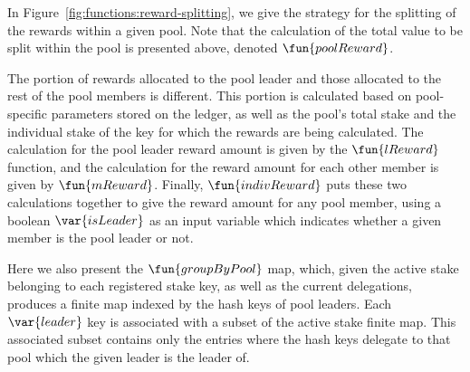 In Figure~\ref{fig:functions:reward-splitting}, we give the strategy for the
splitting of the rewards within a given pool. Note that the calculation of
the total value to be split within the pool is presented above, denoted $\fun{poolReward}$.

The portion of rewards allocated to the pool leader and those allocated to
the rest of the pool members is different. This portion is calculated based
on pool-specific parameters stored on the ledger, as well as
the pool's total stake and the individual stake of the key for which the rewards
are being calculated. The calculation for the pool
leader reward amount is given by the $\fun{lReward}$ function, and the
calculation for the reward amount for each other member is given by $\fun{mReward}$.
Finally, $\fun{indivReward}$ puts these two calculations together to give the
reward amount for any pool member, using a boolean $\var{isLeader}$
as an input variable which indicates
whether a given member is the pool leader or not.

Here we also present the $\fun{groupByPool}$ map, which, given the active stake
belonging to each registered stake key,
as well as the current delegations, produces a
finite map indexed by the hash keys of pool leaders. Each $\var{leader}$ key is associated
with a subset of the active stake finite map. This associated subset
contains only the entries where the hash keys delegate to that pool
which the given leader is the leader of.

